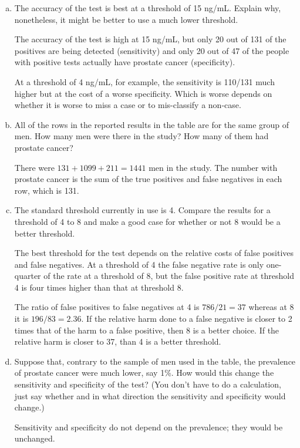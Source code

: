 \begin{enumerate}[(a)]
\item The accuracy of the test is best at a threshold of 15 ng/mL.  Explain why, nonetheless, it might be better to use a much lower threshold.

\TextEntry

\begin{AnswerText}
The accuracy of the test is high at 15 ng/mL, but only 20 out of 131
of the positives are being detected (sensitivity) and only 20 out of
47 of the people with positive tests actually have prostate cancer
(specificity).

At a threshold of 4 ng/mL, for example, the sensitivity is 110/131
much higher but at the cost of a worse specificity.  Which is worse
depends on whether it is worse to miss a case or to mis-classify a non-case.
\end{AnswerText}

\item All of the rows in the reported results in the table are for the same group of men.  How many men were there in the study?  How many of them had prostate cancer?

\TextEntry
\begin{AnswerText}
There were $131+1099+211 = 1441$ men in the study.
The number with prostate cancer is the sum of the
true positives and false negatives in each row, which is 131.
\end{AnswerText}

\item The standard threshold currently in use is 4.  Compare the results for a threshold of 4 to 8 and make a good case for whether or not 8 would be a better threshold.

\TextEntry
\begin{AnswerText}
The best threshold for the test depends on the relative costs of false
positives and false negatives.  At a threshold of 4 the false negative
rate is only one-quarter of the rate at a threshold of 8, but the
false positive rate at threshold 4 is four times higher than that at threshold 8.  

The ratio of false positives to false negatives at 4 is $786/21 = 37$
whereas at 8 it is $196/83=2.36$.  If the relative harm done to a
false negative is closer to 2 times that of the harm to a false
positive, then 8 is a better choice.  If the relative harm is closer
to 37, than 4 is a better threshold.
\end{AnswerText}

\item Suppose that, contrary to the sample of men used in the table, the prevalence of prostate cancer were much lower, say 1\%.  How would this change the sensitivity and specificity of the test?  (You don't have to do a calculation, just say whether and in what direction the sensitivity and specificity would change.)

\TextEntry
\begin{AnswerText}
Sensitivity and specificity do not depend on the prevalence; they
would be unchanged.
\end{AnswerText}

\end{enumerate}
